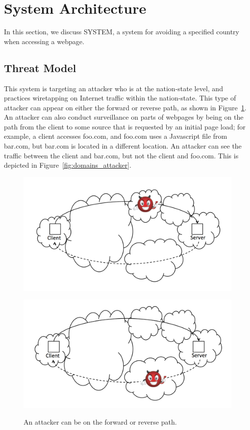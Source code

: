 \section{System Architecture}
\label{architecture}

In this section, we discuss SYSTEM, a system for avoiding a specified country when accessing a webpage.

\subsection{Threat Model}
\label{threat}
This system is targeting an attacker who is at the nation-state level, and practices wiretapping on Internet traffic within the nation-state.  This type of attacker can appear on either the forward or reverse path, as shown in Figure~\ref{fig:attacker}. An attacker can also conduct surveillance on parts of webpages by being on the path from the client to some source that is requested by an initial page load; for example, a client accesses foo.com, and foo.com uses a Javascript file from bar.com, but bar.com is located in a different location.  An attacker can see the traffic between the client and bar.com, but not the client and foo.com.  This is depicted in Figure~\ref{fig:domains_attacker}.

\begin{figure}
\begin{minipage}[c][11cm][t]{.5\textwidth}
  \centering
  \includegraphics[width=.99\textwidth]{forward_evil}
  \label{fig:forward_attack}\par\vfill
  \includegraphics[width=.99\textwidth]{reverse_evil}
  \label{fig:reverse_attack}
\end{minipage}
\caption{An attacker can be on the forward or reverse path.}
\label{fig:attacker}
\end{figure}

